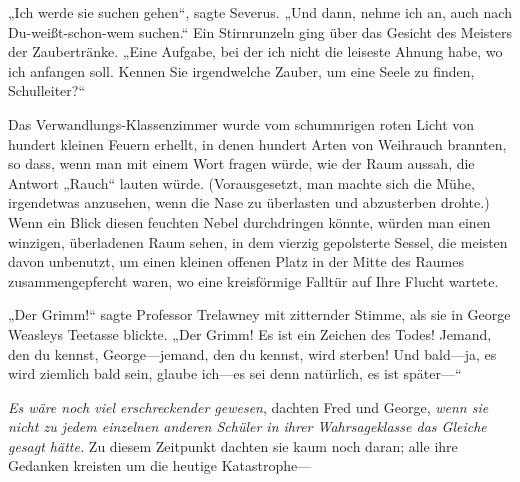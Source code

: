„Ich werde sie suchen gehen“, sagte Severus. „Und dann, nehme ich an, auch nach Du-weißt-schon-wem suchen.“
Ein Stirnrunzeln ging über das Gesicht des Meisters der Zaubertränke.
„Eine Aufgabe, bei der ich nicht die leiseste Ahnung habe, wo ich anfangen soll. Kennen Sie irgendwelche Zauber, um eine Seele zu finden, Schulleiter?“

\later

Das Verwandlungs-Klassenzimmer wurde vom schummrigen roten Licht von hundert kleinen Feuern erhellt, in denen hundert Arten von Weihrauch brannten, so dass, wenn man mit einem Wort fragen würde, wie der Raum aussah, die Antwort „Rauch“ lauten würde.
(Vorausgesetzt, man machte sich die Mühe, irgendetwas anzusehen, wenn die Nase zu überlasten und abzusterben drohte.)
Wenn ein Blick diesen feuchten Nebel durchdringen könnte, würden man einen winzigen, überladenen Raum sehen, in dem vierzig gepolsterte Sessel, die meisten davon unbenutzt, um einen kleinen offenen Platz in der Mitte des Raumes zusammengepfercht waren, wo eine kreisförmige Falltür auf Ihre Flucht wartete.

„Der Grimm!“ sagte Professor Trelawney mit zitternder Stimme, als sie in George Weasleys Teetasse blickte. „Der Grimm! Es ist ein Zeichen des Todes! Jemand, den du kennst, George—jemand, den du kennst, wird sterben! Und bald—ja, es wird ziemlich bald sein, glaube ich—es sei denn natürlich, es ist später—“

\emph{Es wäre noch viel erschreckender gewesen}, dachten Fred und George, \emph{wenn sie nicht zu jedem einzelnen anderen Schüler in ihrer Wahrsageklasse das Gleiche gesagt hätte.}
Zu diesem Zeitpunkt dachten sie kaum noch daran; alle ihre Gedanken kreisten um die heutige Katastrophe—

